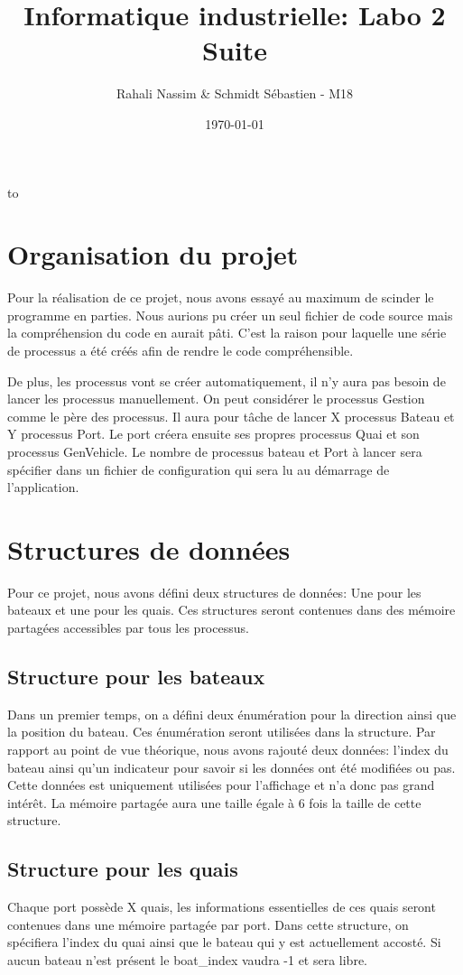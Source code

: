 \documentclass[a4paper, 11pt]{article}
\date{\today}
\author{}
\title{}
\title{Informatique industrielle: Labo 2 Suite}
\author{Rahali Nassim \& Schmidt Sébastien -  M18}
\makeatletter
\def\clap#1{\hbox to 0pt{\hss #1\hss}}%
\def\haut#1#2#3{%
\hbox to \hsize{%
\rlap{\vtop{\raggedright #1}}%
\hss
\clap{\vtop{\centering #2}}%
\hss
\llap{\vtop{\raggedleft #3}}}}%
\def\bas#1#2#3{%
\hbox to \hsize{%
\rlap{\vbox{\raggedright #1}}%
\hss
\clap{\vbox{\centering #2}}%
\hss
\llap{\vbox{\raggedleft #3}}}}%
\def\maketitle{%
\thispagestyle{empty}\vbox to \vsize{%
\haut{}{\@blurb}{}
\vfill
\vspace{1cm}
\begin{flushleft}
\usefont{OT1}{ptm}{m}{n}
\huge \@title
\end{flushleft}
\par
\hrule height 4pt
\par
\begin{flushright}
\usefont{OT1}{phv}{m}{n}
\Large \@author
\par
\end{flushright}
\vspace{1cm}
\vfill
\vfill
\bas{}{\@location, le \@date}{}
}%
\cleardoublepage
}
\makeatother
\begin{document}
\maketitle

\tableofcontents
\newpage

\section{Organisation du projet}
	Pour la réalisation de ce projet, nous avons essayé au maximum de scinder le programme en parties. Nous aurions pu créer un seul fichier de code source mais la compréhension du code en aurait pâti. C'est la raison pour laquelle une série de processus a été créés afin de rendre le code compréhensible. 
	
	De plus, les processus vont se créer automatiquement, il n'y aura pas besoin de lancer les processus manuellement. On peut considérer le processus Gestion comme le père des processus. Il aura pour tâche de lancer X processus Bateau et Y processus Port. Le port créera ensuite ses propres processus Quai et son processus GenVehicle. Le nombre de processus bateau et Port à lancer sera spécifier dans un fichier de configuration qui sera lu au démarrage de l'application.
	
\section{Structures de données}
	Pour ce projet, nous avons défini deux structures de données: Une pour les bateaux et une pour les quais. Ces structures seront contenues dans des mémoire partagées accessibles par tous les processus.
	\subsection{Structure pour les bateaux}
		
		Dans un premier temps, on a défini deux énumération pour la direction ainsi que la position du bateau. Ces énumération seront utilisées dans la structure. Par rapport au point de vue théorique, nous avons rajouté deux données: l'index du bateau ainsi qu'un indicateur pour savoir si les données ont été modifiées ou pas. Cette données est uniquement utilisées pour l'affichage et n'a donc pas grand intérêt. La mémoire partagée aura une taille égale à 6 fois la taille de cette structure.
	\subsection{Structure pour les quais}
		
		Chaque port possède X quais, les informations essentielles de ces quais seront contenues dans une mémoire partagée par port. Dans cette structure, on spécifiera l'index du quai ainsi que le bateau qui y est actuellement accosté. Si aucun bateau n'est présent le boat\_index vaudra -1 et sera libre.	
\end{document}
